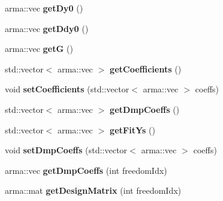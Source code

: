 \begin{DoxyCompactItemize}
\item 
arma\+::vec {\bfseries get\+Dy0} ()\hypertarget{classkukadu_1_1Dmp_a507c50bd598249260b23368ed5ea88c8}{}\label{classkukadu_1_1Dmp_a507c50bd598249260b23368ed5ea88c8}

\item 
arma\+::vec {\bfseries get\+Ddy0} ()\hypertarget{classkukadu_1_1Dmp_a625b8794d3e59632412f76d447ccc430}{}\label{classkukadu_1_1Dmp_a625b8794d3e59632412f76d447ccc430}

\item 
arma\+::vec {\bfseries getG} ()\hypertarget{classkukadu_1_1Dmp_ac8c841b12e4eb2678424d96c6dbbb5bc}{}\label{classkukadu_1_1Dmp_ac8c841b12e4eb2678424d96c6dbbb5bc}

\item 
std\+::vector$<$ arma\+::vec $>$ {\bfseries get\+Coefficients} ()\hypertarget{classkukadu_1_1Dmp_a4b477fea8132d45d50617d9027f55634}{}\label{classkukadu_1_1Dmp_a4b477fea8132d45d50617d9027f55634}

\item 
void {\bfseries set\+Coefficients} (std\+::vector$<$ arma\+::vec $>$ coeffs)\hypertarget{classkukadu_1_1Dmp_ace27ff809c779f83daf1fd903636a332}{}\label{classkukadu_1_1Dmp_ace27ff809c779f83daf1fd903636a332}

\item 
std\+::vector$<$ arma\+::vec $>$ {\bfseries get\+Dmp\+Coeffs} ()\hypertarget{classkukadu_1_1Dmp_aec1043e1b9eda2418848eca83e3b7ae1}{}\label{classkukadu_1_1Dmp_aec1043e1b9eda2418848eca83e3b7ae1}

\item 
std\+::vector$<$ arma\+::vec $>$ {\bfseries get\+Fit\+Ys} ()\hypertarget{classkukadu_1_1Dmp_aa9074177aa8d7272d83456cf9aafde4c}{}\label{classkukadu_1_1Dmp_aa9074177aa8d7272d83456cf9aafde4c}

\item 
void {\bfseries set\+Dmp\+Coeffs} (std\+::vector$<$ arma\+::vec $>$ coeffs)\hypertarget{classkukadu_1_1Dmp_a6feb8dc33dc6b8b6cd032fa3b234dec0}{}\label{classkukadu_1_1Dmp_a6feb8dc33dc6b8b6cd032fa3b234dec0}

\item 
arma\+::vec {\bfseries get\+Dmp\+Coeffs} (int freedom\+Idx)\hypertarget{classkukadu_1_1Dmp_acf8b80c2993b1588d5aeab638480222d}{}\label{classkukadu_1_1Dmp_acf8b80c2993b1588d5aeab638480222d}

\item 
arma\+::mat {\bfseries get\+Design\+Matrix} (int freedom\+Idx)\hypertarget{classkukadu_1_1Dmp_ad8cbaf545f773e2b347521c4d4f81972}{}\label{classkukadu_1_1Dmp_ad8cbaf545f773e2b347521c4d4f81972}


\end{DoxyCompactItemize}
